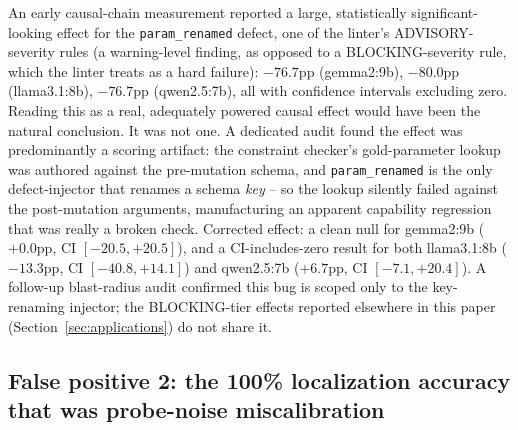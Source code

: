 \documentclass[11pt]{article}
\begin{document}
An early causal-chain measurement reported a large, statistically significant-looking effect for
the \texttt{param\_renamed} defect, one of the linter's ADVISORY-severity rules (a warning-level
finding, as opposed to a BLOCKING-severity rule, which the linter treats as a hard failure):
$-76.7$pp (gemma2:9b), $-80.0$pp (llama3.1:8b),
$-76.7$pp (qwen2.5:7b), all with confidence intervals excluding zero.
Reading this as a real, adequately powered causal effect would have been the natural conclusion.
It was not one. A dedicated audit found the effect was predominantly a scoring artifact: the
constraint checker's gold-parameter lookup was authored against the pre-mutation schema, and
\texttt{param\_renamed} is the only defect-injector that renames a schema \emph{key} -- so the
lookup silently failed against the post-mutation arguments, manufacturing an apparent capability
regression that was really a broken check. Corrected effect: a clean null for gemma2:9b
($+0.0$pp, CI $[-20.5,+20.5]$), and a CI-includes-zero result for both llama3.1:8b
($-13.3$pp, CI $[-40.8,+14.1]$) and qwen2.5:7b ($+6.7$pp, CI $[-7.1,+20.4]$).
A follow-up blast-radius audit confirmed this bug is scoped only to the
key-renaming injector; the BLOCKING-tier effects reported elsewhere in this paper
(Section~\ref{sec:applications}) do not share it.

\subsection{False positive 2: the 100\% localization accuracy that was probe-noise miscalibration}
\label{sec:artifact10}
\end{document}
